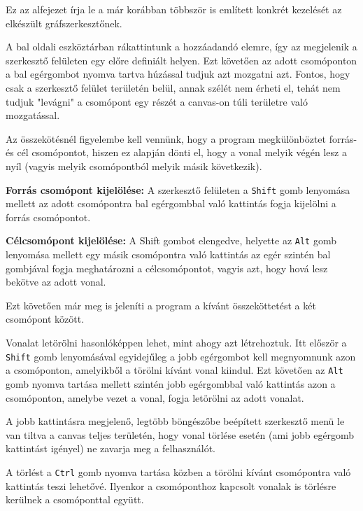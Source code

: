 Ez az alfejezet írja le a már korábban többször is említett konkrét kezelését az elkészült gráfszerkesztőnek.


A bal oldali eszköztárban rákattintunk a hozzáadandó elemre, így az megjelenik a szerkesztő felületen egy előre definiált helyen. Ezt követően az adott csomóponton a bal egérgombot nyomva tartva húzással tudjuk azt mozgatni azt. Fontos, hogy csak a szerkesztő felület területén belül, annak szélét nem érheti el, tehát nem tudjuk "levágni" a csomópont egy részét a canvas-on túli területre való mozgatással.


Az összekötésnél figyelembe kell vennünk, hogy a program megkülönböztet forrás- és cél csomópontot, hiszen ez alapján dönti el, hogy a vonal melyik végén lesz a nyíl (vagyis melyik csomópontból melyik másik következik).

\textbf{Forrás csomópont kijelölése:} A szerkesztő felületen a \texttt{Shift} gomb lenyomása mellett az adott csomópontra bal egérgombbal való kattintás fogja kijelölni a forrás csomópontot.

\textbf{Célcsomópont kijelölése:} A Shift gombot elengedve, helyette az \texttt{Alt} gomb lenyomása mellett egy másik csomópontra való kattintás az egér szintén bal gombjával fogja meghatározni a célcsomópontot, vagyis azt, hogy hová lesz bekötve az adott vonal.

Ezt követően már meg is jeleníti a program a kívánt összeköttetést a két csomópont között.


Vonalat letörölni hasonlóképpen lehet, mint ahogy azt létrehoztuk. Itt először a \texttt{Shift} gomb lenyomásával egyidejűleg a jobb egérgombot kell megnyomnunk azon a csomóponton, amelyikből a törölni kívánt vonal kiindul. Ezt követően az \texttt{Alt} gomb nyomva tartása mellett szintén jobb egérgombbal való kattintás azon a csomóponton, amelybe vezet a vonal, fogja letörölni az adott vonalat.

A jobb kattintásra megjelenő, legtöbb böngészőbe beépített szerkesztő menü le van tiltva a canvas teljes területén, hogy vonal törlése esetén (ami jobb egérgomb kattintást igényel) ne zavarja meg a felhasználót.


A törlést a \texttt{Ctrl} gomb nyomva tartása közben a törölni kívánt csomópontra való kattintás teszi lehetővé. Ilyenkor a csomóponthoz kapcsolt vonalak is törlésre kerülnek a csomóponttal együtt.

